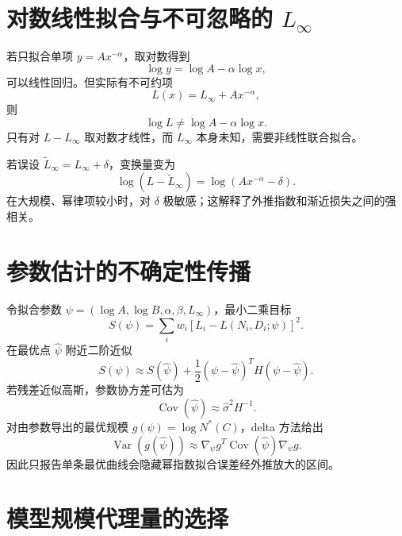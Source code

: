 \documentclass[11pt]{article}
\numberwithin{equation}{section}
\newcommand{\1}{\mathbf{1}}
\newcommand{\Var}{\operatorname{Var}}
\newcommand{\Cov}{\operatorname{Cov}}
\begin{document}
\section{对数线性拟合与不可忽略的 $L_\infty$}

若只拟合单项 $y=A x^{-\alpha}$，取对数得到
\begin{equation}
 \log y=\log A-\alpha\log x,
\end{equation}
可以线性回归。但实际有不可约项
\begin{equation}
 L(x)=L_\infty+A x^{-\alpha},
\end{equation}
则
\begin{equation}
 \log L\ne\log A-\alpha\log x.
\end{equation}
只有对 $L-L_\infty$ 取对数才线性，而 $L_\infty$ 本身未知，需要非线性联合拟合。

若误设 $\widetilde L_\infty=L_\infty+\delta$，变换量变为
\begin{equation}
 \log(L-\widetilde L_\infty)
 =\log(Ax^{-\alpha}-\delta).
\end{equation}
在大规模、幂律项较小时，对 $\delta$ 极敏感；这解释了外推指数和渐近损失之间的强相关。

\section{参数估计的不确定性传播}

令拟合参数
$\psi=(\log A,\log B,\alpha,\beta,L_\infty)$，最小二乘目标
\begin{equation}
 S(\psi)=\sum_i w_i[L_i-L(N_i,D_i;\psi)]^2.
\end{equation}
在最优点 $\widehat\psi$ 附近二阶近似
\begin{equation}
 S(\psi)\approx S(\widehat\psi)
 +\frac12(\psi-\widehat\psi)^TH(\psi-\widehat\psi).
\end{equation}
若残差近似高斯，参数协方差可估为
\begin{equation}
 \Cov(\widehat\psi)\approx\widehat\sigma^2H^{-1}.
\end{equation}
对由参数导出的最优规模 $g(\psi)=\log N^*(C)$，delta 方法给出
\begin{equation}
 \Var(g(\widehat\psi))
 \approx\nabla_\psi g^T\Cov(\widehat\psi)\nabla_\psi g.
\end{equation}
因此只报告单条最优曲线会隐藏幂指数拟合误差经外推放大的区间。

\section{模型规模代理量的选择}
\end{document}
